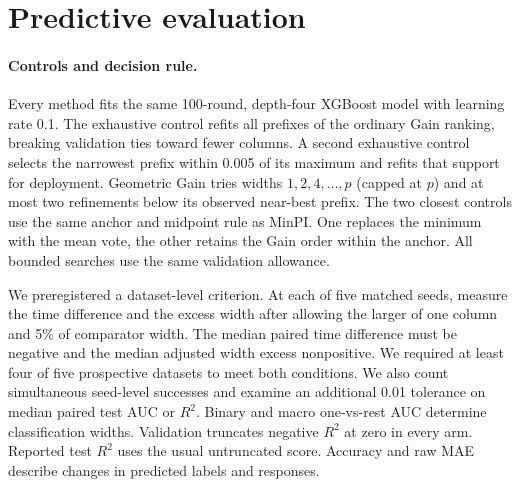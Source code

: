 \section{Predictive evaluation}

\paragraph{Controls and decision rule.}
Every method fits the same 100-round, depth-four XGBoost model with learning rate 0.1. The exhaustive control refits all prefixes of the ordinary Gain ranking, breaking validation ties toward fewer columns. A second exhaustive control selects the narrowest prefix within 0.005 of its maximum and refits that support for deployment. Geometric Gain tries widths $1,2,4,\ldots,p$ (capped at $p$) and at most two refinements below its observed near-best prefix. The two closest controls use the same anchor and midpoint rule as MinPI. One replaces the minimum with the mean vote, the other retains the Gain order within the anchor. All bounded searches use the same validation allowance.

We preregistered a dataset-level criterion. At each of five matched seeds, measure the time difference and the excess width after allowing the larger of one column and 5\% of comparator width. The median paired time difference must be negative and the median adjusted width excess nonpositive. We required at least four of five prospective datasets to meet both conditions. We also count simultaneous seed-level successes and examine an additional 0.01 tolerance on median paired test AUC or $R^2$. Binary and macro one-vs-rest AUC determine classification widths. Validation truncates negative $R^2$ at zero in every arm. Reported test $R^2$ uses the usual untruncated score. Accuracy and raw MAE describe changes in predicted labels and responses.

